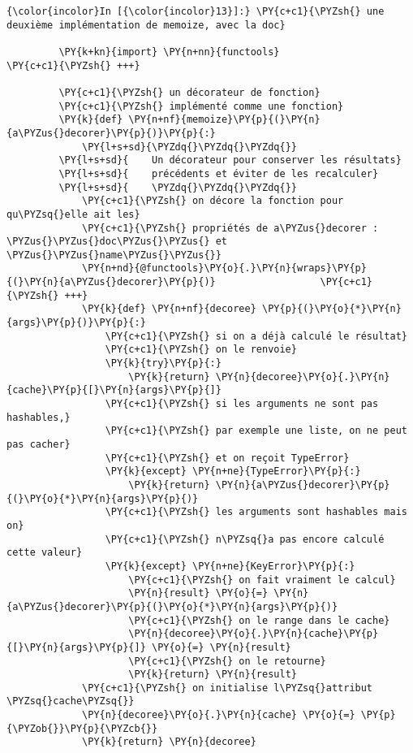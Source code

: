     \begin{Verbatim}[commandchars=\\\{\},frame=single,framerule=0.3mm,rulecolor=\color{cellframecolor}]
{\color{incolor}In [{\color{incolor}13}]:} \PY{c+c1}{\PYZsh{} une deuxième implémentation de memoize, avec la doc}
         
         \PY{k+kn}{import} \PY{n+nn}{functools}                                 \PY{c+c1}{\PYZsh{} +++}
         
         \PY{c+c1}{\PYZsh{} un décorateur de fonction}
         \PY{c+c1}{\PYZsh{} implémenté comme une fonction}
         \PY{k}{def} \PY{n+nf}{memoize}\PY{p}{(}\PY{n}{a\PYZus{}decorer}\PY{p}{)}\PY{p}{:}
             \PY{l+s+sd}{\PYZdq{}\PYZdq{}\PYZdq{}}
         \PY{l+s+sd}{    Un décorateur pour conserver les résultats}
         \PY{l+s+sd}{    précédents et éviter de les recalculer}
         \PY{l+s+sd}{    \PYZdq{}\PYZdq{}\PYZdq{}}
             \PY{c+c1}{\PYZsh{} on décore la fonction pour qu\PYZsq{}elle ait les}
             \PY{c+c1}{\PYZsh{} propriétés de a\PYZus{}decorer : \PYZus{}\PYZus{}doc\PYZus{}\PYZus{} et \PYZus{}\PYZus{}name\PYZus{}\PYZus{}}
             \PY{n+nd}{@functools}\PY{o}{.}\PY{n}{wraps}\PY{p}{(}\PY{n}{a\PYZus{}decorer}\PY{p}{)}                  \PY{c+c1}{\PYZsh{} +++}
             \PY{k}{def} \PY{n+nf}{decoree} \PY{p}{(}\PY{o}{*}\PY{n}{args}\PY{p}{)}\PY{p}{:}
                 \PY{c+c1}{\PYZsh{} si on a déjà calculé le résultat}
                 \PY{c+c1}{\PYZsh{} on le renvoie}
                 \PY{k}{try}\PY{p}{:}
                     \PY{k}{return} \PY{n}{decoree}\PY{o}{.}\PY{n}{cache}\PY{p}{[}\PY{n}{args}\PY{p}{]}
                 \PY{c+c1}{\PYZsh{} si les arguments ne sont pas hashables,}
                 \PY{c+c1}{\PYZsh{} par exemple une liste, on ne peut pas cacher}
                 \PY{c+c1}{\PYZsh{} et on reçoit TypeError}
                 \PY{k}{except} \PY{n+ne}{TypeError}\PY{p}{:}
                     \PY{k}{return} \PY{n}{a\PYZus{}decorer}\PY{p}{(}\PY{o}{*}\PY{n}{args}\PY{p}{)}
                 \PY{c+c1}{\PYZsh{} les arguments sont hashables mais on}
                 \PY{c+c1}{\PYZsh{} n\PYZsq{}a pas encore calculé cette valeur}
                 \PY{k}{except} \PY{n+ne}{KeyError}\PY{p}{:}
                     \PY{c+c1}{\PYZsh{} on fait vraiment le calcul}
                     \PY{n}{result} \PY{o}{=} \PY{n}{a\PYZus{}decorer}\PY{p}{(}\PY{o}{*}\PY{n}{args}\PY{p}{)}
                     \PY{c+c1}{\PYZsh{} on le range dans le cache}
                     \PY{n}{decoree}\PY{o}{.}\PY{n}{cache}\PY{p}{[}\PY{n}{args}\PY{p}{]} \PY{o}{=} \PY{n}{result}
                     \PY{c+c1}{\PYZsh{} on le retourne}
                     \PY{k}{return} \PY{n}{result}
             \PY{c+c1}{\PYZsh{} on initialise l\PYZsq{}attribut \PYZsq{}cache\PYZsq{}}
             \PY{n}{decoree}\PY{o}{.}\PY{n}{cache} \PY{o}{=} \PY{p}{\PYZob{}}\PY{p}{\PYZcb{}}
             \PY{k}{return} \PY{n}{decoree}
\end{Verbatim}


